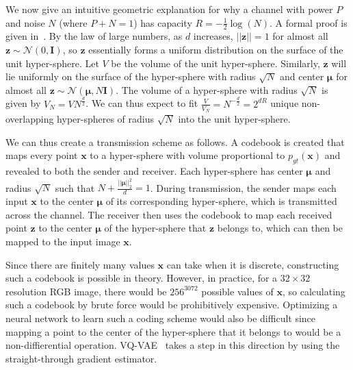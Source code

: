 \documentclass{article}
\begin{document}
We now give an intuitive geometric explanation for why a channel with power $P$ and noise $N$ (where $P+N=1$) has capacity $R=-\frac{1}{2}\log(N)$. A formal proof is given in~\cite{cover2012elements}.
By the law of large numbers, as $d$ increases,  $||\mathbf{z}||=1$ for almost all $\mathbf{z}\sim \mathcal{N}(0,\mathbf{I})$, so $\mathbf{z}$ essentially forms a uniform distribution on the surface of the unit hyper-sphere. Let $V$ be the volume of the unit hyper-sphere.
Similarly, $\mathbf{z}$ will lie uniformly on the surface of the hyper-sphere with radius $\sqrt{N}$ and center $\boldsymbol \mu$ for almost all $\mathbf{z}\sim \mathcal{N}(\boldsymbol \mu, N \mathbf{I})$. The volume of a hyper-sphere with radius $\sqrt{N}$ is given by $V_N = V N^{\frac{d}{2}}$.
We can thus expect to fit $\frac{V}{V_N} = N^{-\frac{d}{2}} = 2^{dR}$ unique non-overlapping hyper-spheres of radius $\sqrt{N}$ into the unit hyper-sphere.


We can thus create a transmission scheme as follows.
A codebook is created that maps every point $\mathbf{x}$ to a hyper-sphere with volume proportional to $p_{gt}(\mathbf{x})$ and revealed to both the sender and receiver.
Each hyper-sphere has center $\boldsymbol \mu$ and radius $\sqrt{N}$ such that $N + \frac{||\boldsymbol \mu||_2^2}{d} =1$.
During transmission, the sender maps each input $\mathbf{x}$ to the center $\boldsymbol \mu$ of its corresponding hyper-sphere, which is transmitted across the channel.
The receiver then uses the codebook to map each received point $\mathbf{z}$ to the center $\boldsymbol \mu$ of the hyper-sphere that  $\mathbf{z}$ belongs to, which can then be mapped to the input image $\mathbf{x}$.

Since there are finitely many values $\mathbf{x}$ can take when it is discrete, constructing such a codebook is possible in theory. However, in practice, for a $32\times 32$ resolution RGB image, there would be $256^{3072}$ possible values of $\mathbf{x}$, so calculating such a codebook by brute force would be prohibitively expensive.
Optimizing a neural network to learn such a coding scheme would also be difficult since mapping a point to the center of the hyper-sphere that it belongs to would be a non-diffierential operation.
VQ-VAE~\cite{oord2017neural} takes a step in this direction by using the straight-through gradient estimator.
\end{document}
